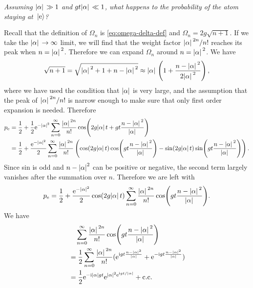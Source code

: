 \documentclass[hyperref, a4paper]{article}
\newcommand*{\ii}{\mathrm{i}}
\newcommand*{\ee}{\mathrm{e}}
\newcommand*{\kete}{\ket*{\text{e}}}
\newcommand*{\pope}{p_{\text{e}}}
\begin{document}
\textit{Assuming $\abs*{\alpha} \gg 1$ and $g t \abs*{\alpha} \ll 1$, what happens to the probability of the atom staying at $\kete$?}

Recall that the definition of $\Omega_n$ is \eqref{eq:omega-delta-def}
and $\Omega_n = 2 g \sqrt{n+1}$.
If we take the $\abs*{\alpha} \to \infty$ limit,
we will find that the weight factor $\abs*{\alpha}^{2n} / n!$ reaches its peak when $n = \abs*{\alpha}^2$.
Therefore we can expand $\Omega_n$ around $n = \abs*{\alpha}^2$.
We have 
\[
    \sqrt{n+1} = \sqrt{\abs*{\alpha}^2 + 1 + n - \abs*{\alpha}^2 }
    \approx \abs*{\alpha} \left( 1 + \frac{n - \abs*{\alpha}^2 }{2 \abs*{\alpha}^2} \right),
\]
where we have used the condition that $\abs{\alpha}$ is very large, 
and the assumption that the peak of  $\abs*{\alpha}^{2n} / n!$ is narrow enough 
to make sure that only first order expansion is needed.
Therefore 
\begin{equation}
    \begin{aligned}
        \pope &= \frac{1}{2} + \frac{1}{2} \ee^{- \abs*{\alpha}^2} \sum_{n=0}^{\infty} \frac{\abs*{\alpha}^{2n}}{n!} 
        \cos(
            2 g \abs*{\alpha} t + g t \frac{n - \abs*{\alpha}^2}{\abs*{\alpha}}
        ) \\
        &= \frac{1}{2} + \frac{\ee^{- \abs*{\alpha}^2}}{2} \sum_{n=0}^{\infty} \frac{\abs*{\alpha}^{2n}}{n!} 
        \left(\cos( 2 g \abs*{\alpha} t) \cos(
            g t \frac{n - \abs*{\alpha}^2 }{\abs*{\alpha}}
        ) - \sin( 2 g \abs*{\alpha} t) \sin(
            g t \frac{n - \abs*{\alpha}^2 }{\abs*{\alpha}}
        )\right).
    \end{aligned}
\end{equation}
Since sin is odd and $n - \abs{\alpha}^2$ can be positive or negative,
the second term largely vanishes after the summation over $n$.
Therefore we are left with 
\begin{equation}
    \begin{aligned}
        \pope = \frac{1}{2} + \frac{\ee^{- \abs*{\alpha}^2}}{2} 
        \cos( 2 g \abs*{\alpha} t)  \sum_{n=0}^{\infty} \frac{\abs*{\alpha}^{2n}}{n!} 
        \cos(
            g t \frac{n - \abs*{\alpha}^2 }{\abs*{\alpha}}
        ).
    \end{aligned}
\end{equation}
We have 
\[
    \begin{aligned}
        &\quad \sum_{n=0}^{\infty} \frac{\abs*{\alpha}^{2n}}{n!} 
        \cos(
            g t \frac{n - \abs*{\alpha}^2 }{\abs*{\alpha}}
        ) \\
        &= \frac{1}{2} \sum_{n=0}^{\infty} \frac{\abs*{\alpha}^{2n}}{n!} 
        (
            \ee^{\ii g t \frac{n - \abs*{\alpha}^2 }{\abs*{\alpha}}}
            + \ee^{-\ii g t \frac{n - \abs*{\alpha}^2 }{\abs*{\alpha}}}
        ) \\
        &= \frac{1}{2} \ee^{- \ii \abs{\alpha} g t} \ee^{\abs{\alpha}^2 \ee^{\ii g t / \abs{\alpha}}} + \text{c.c.}
    \end{aligned}
\]
\end{document}

